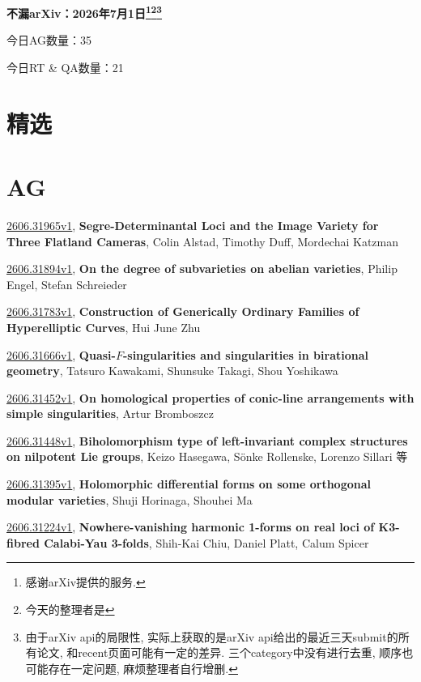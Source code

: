 \documentclass[9pt, a4paper]{article}
\theoremstyle{plain}
\theoremstyle{definition}
\theoremstyle{remark}
\newcommand{\arxiv}[3]{\href{https://arxiv.org/abs/#1}{#1}, \textbf{\textcolor{arxivblue}{#2}}, #3}
\newcommand{\AGnumber}{35}
\newcommand{\RTQAnumber}{21}
\newcommand{\NewestDate}{2026年7月1日}
\newcommand{\todayarXiver}{} %
\begin{document}
\begin{center}
    \Huge\textbf{不漏arXiv：\NewestDate\footnote{感谢arXiv提供的服务.}\footnote{今天的整理者是\todayarXiver}\footnote{由于arXiv api的局限性, 实际上获取的是arXiv api给出的最近三天submit的所有论文, 和recent页面可能有一定的差异. 三个category中没有进行去重, 顺序也可能存在一定问题, 麻烦整理者自行增删.}} \\
\end{center}

\setcounter{section}{-1}

\begin{center}
    今日AG数量：\AGnumber
    
    今日RT \& QA数量：\RTQAnumber
    
\end{center}


\section{精选}


\section{AG}
\arxiv{2606.31965v1}{Segre-Determinantal Loci and the Image Variety for Three Flatland Cameras}{Colin Alstad, Timothy Duff, Mordechai Katzman}

\arxiv{2606.31894v1}{On the degree of subvarieties on abelian varieties}{Philip Engel, Stefan Schreieder}

\arxiv{2606.31783v1}{Construction of Generically Ordinary Families of Hyperelliptic Curves}{Hui June Zhu}

\arxiv{2606.31666v1}{Quasi-$F$-singularities and singularities in birational geometry}{Tatsuro Kawakami, Shunsuke Takagi, Shou Yoshikawa}

\arxiv{2606.31452v1}{On homological properties of conic-line arrangements with simple singularities}{Artur Bromboszcz}

\arxiv{2606.31448v1}{Biholomorphism type of left-invariant complex structures on nilpotent Lie groups}{Keizo Hasegawa, Sönke Rollenske, Lorenzo Sillari 等}

\arxiv{2606.31395v1}{Holomorphic differential forms on some orthogonal modular varieties}{Shuji Horinaga, Shouhei Ma}

\arxiv{2606.31224v1}{Nowhere-vanishing harmonic 1-forms on real loci of K3-fibred Calabi-Yau 3-folds}{Shih-Kai Chiu, Daniel Platt, Calum Spicer}
\end{document}
